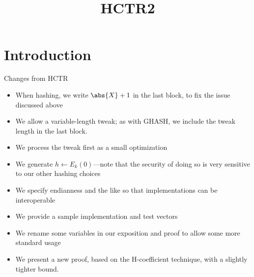 \documentclass[letterpaper,11pt]{article}
\title{HCTR2}
\begin{document}
\maketitle

\begin{abstract}
\end{abstract}

\section{Introduction}
Changes from HCTR
\begin{itemize}
    \item When hashing, we write \(\abs{X} + 1\) in the last block, to fix the issue discussed above
    \item We allow a variable-length tweak; as with GHASH, we include the tweak length in the last block.
    \item We process the tweak first as a small optimization
    \item We generate \(h \gets E_k(0)\)---note that the security of doing so is very sensitive to our other hashing choices
    \item We specify endianness and the like so that implementations can be interoperable
    \item We provide a sample implementation and test vectors
    \item We rename some variables in our exposition and proof to allow some more standard usage
    \item We present a new proof, based on the H-coefficient technique, with a slightly tighter bound.
\end{itemize}
\end{document}
